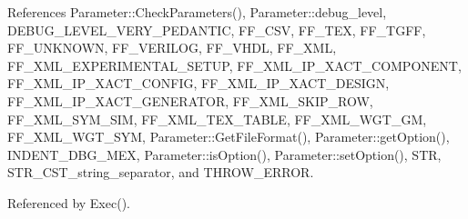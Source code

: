 References Parameter\+::\+Check\+Parameters(), Parameter\+::debug\+\_\+level, D\+E\+B\+U\+G\+\_\+\+L\+E\+V\+E\+L\+\_\+\+V\+E\+R\+Y\+\_\+\+P\+E\+D\+A\+N\+T\+IC, F\+F\+\_\+\+C\+SV, F\+F\+\_\+\+T\+EX, F\+F\+\_\+\+T\+G\+FF, F\+F\+\_\+\+U\+N\+K\+N\+O\+WN, F\+F\+\_\+\+V\+E\+R\+I\+L\+OG, F\+F\+\_\+\+V\+H\+DL, F\+F\+\_\+\+X\+ML, F\+F\+\_\+\+X\+M\+L\+\_\+\+E\+X\+P\+E\+R\+I\+M\+E\+N\+T\+A\+L\+\_\+\+S\+E\+T\+UP, F\+F\+\_\+\+X\+M\+L\+\_\+\+I\+P\+\_\+\+X\+A\+C\+T\+\_\+\+C\+O\+M\+P\+O\+N\+E\+NT, F\+F\+\_\+\+X\+M\+L\+\_\+\+I\+P\+\_\+\+X\+A\+C\+T\+\_\+\+C\+O\+N\+F\+IG, F\+F\+\_\+\+X\+M\+L\+\_\+\+I\+P\+\_\+\+X\+A\+C\+T\+\_\+\+D\+E\+S\+I\+GN, F\+F\+\_\+\+X\+M\+L\+\_\+\+I\+P\+\_\+\+X\+A\+C\+T\+\_\+\+G\+E\+N\+E\+R\+A\+T\+OR, F\+F\+\_\+\+X\+M\+L\+\_\+\+S\+K\+I\+P\+\_\+\+R\+OW, F\+F\+\_\+\+X\+M\+L\+\_\+\+S\+Y\+M\+\_\+\+S\+IM, F\+F\+\_\+\+X\+M\+L\+\_\+\+T\+E\+X\+\_\+\+T\+A\+B\+LE, F\+F\+\_\+\+X\+M\+L\+\_\+\+W\+G\+T\+\_\+\+GM, F\+F\+\_\+\+X\+M\+L\+\_\+\+W\+G\+T\+\_\+\+S\+YM, Parameter\+::\+Get\+File\+Format(), Parameter\+::get\+Option(), I\+N\+D\+E\+N\+T\+\_\+\+D\+B\+G\+\_\+\+M\+EX, Parameter\+::is\+Option(), Parameter\+::set\+Option(), S\+TR, S\+T\+R\+\_\+\+C\+S\+T\+\_\+string\+\_\+separator, and T\+H\+R\+O\+W\+\_\+\+E\+R\+R\+OR.



Referenced by Exec().

